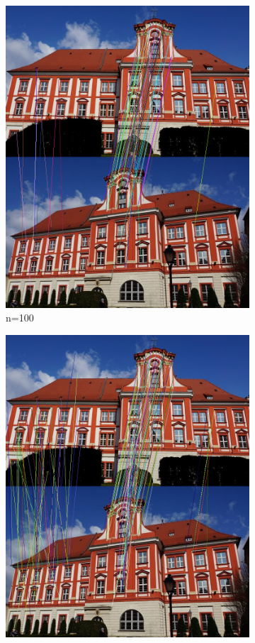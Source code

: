 \documentclass{article}
\begin{document}
\begin{figure}[H]
\begin{subfigure}[b]{0.4\linewidth}
			\includegraphics[width=\linewidth]{s100.png}
			\caption{n=100}
		\end{subfigure}
		\begin{subfigure}[b]{0.4\linewidth}
			\includegraphics[width=\linewidth]{s150.png}

\end{subfigure}
\end{figure}
\end{document}
